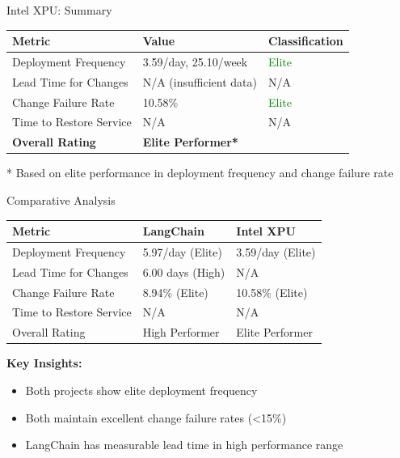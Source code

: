 \documentclass[aspectratio=169]{beamer}
\begin{document}
\begin{frame}{Intel XPU: Summary}
  \begin{table}
    \centering
    \begin{tabular}{@{}lll@{}}
      \toprule
      \textbf{Metric} & \textbf{Value} & \textbf{Classification} \\
      \midrule
      Deployment Frequency & 3.59/day, 25.10/week & \textcolor{green}{Elite} \\
      Lead Time for Changes & N/A (insufficient data) & N/A \\
      Change Failure Rate & 10.58\% & \textcolor{green}{Elite} \\
      Time to Restore Service & N/A & N/A \\
      \midrule
      \textbf{Overall Rating} & \multicolumn{2}{l}{\textbf{Elite Performer*}} \\
      \bottomrule
    \end{tabular}
  \end{table}

  \vspace{0.3cm}
  \small{* Based on elite performance in deployment frequency and change failure rate}
\end{frame}

\begin{frame}{Comparative Analysis}
  \begin{table}
    \centering
    \begin{tabular}{@{}lll@{}}
      \toprule
      \textbf{Metric} & \textbf{LangChain} & \textbf{Intel XPU} \\
      \midrule
      Deployment Frequency & 5.97/day (Elite) & 3.59/day (Elite) \\
      Lead Time for Changes & 6.00 days (High) & N/A \\
      Change Failure Rate & 8.94\% (Elite) & 10.58\% (Elite) \\
      Time to Restore Service & N/A & N/A \\
      \midrule
      Overall Rating & High Performer & Elite Performer \\
      \bottomrule
    \end{tabular}
  \end{table}

  \vspace{0.3cm}
  \textbf{Key Insights:}
  \begin{itemize}
    \item Both projects show elite deployment frequency
    \item Both maintain excellent change failure rates (<15\%)
    \item LangChain has measurable lead time in high performance range
  \end{itemize}
\end{frame}
\end{document}
